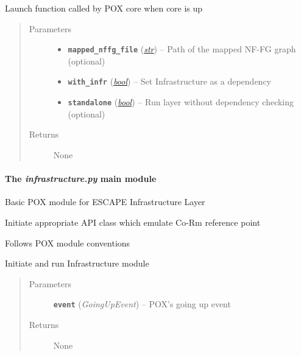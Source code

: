 \documentclass[letterpaper,10pt,english]{sphinxmanual}
\begin{document}
\begin{fulllineitems}
\label{adaptation:adaptation.launch}
Launch function called by POX core when core is up
\begin{quote}\begin{description}
\item[{Parameters}] \leavevmode\begin{itemize}
\item {} 
\textbf{\texttt{mapped\_nffg\_file}} (\href{https://docs.python.org/2.7/library/functions.html\#str}{\emph{str}}) -- Path of the mapped NF-FG graph (optional)

\item {} 
\textbf{\texttt{with\_infr}} (\href{https://docs.python.org/2.7/library/functions.html\#bool}{\emph{bool}}) -- Set Infrastructure as a dependency

\item {} 
\textbf{\texttt{standalone}} (\href{https://docs.python.org/2.7/library/functions.html\#bool}{\emph{bool}}) -- Run layer without dependency checking (optional)

\end{itemize}

\item[{Returns}] \leavevmode
None

\end{description}\end{quote}

\end{fulllineitems}



\paragraph{The \emph{infrastructure.py} main module}
\label{infrastructure:module-infrastructure}\label{infrastructure:the-infrastructure-py-main-module}\label{infrastructure::doc}
Basic POX module for ESCAPE Infrastructure Layer

Initiate appropriate API class which emulate Co-Rm reference point

Follows POX module conventions

\begin{fulllineitems}
\label{infrastructure:infrastructure._start_layer}
Initiate and run Infrastructure module
\begin{quote}\begin{description}
\item[{Parameters}] \leavevmode
\textbf{\texttt{event}} (\emph{GoingUpEvent}) -- POX's going up event

\item[{Returns}] \leavevmode
None

\end{description}\end{quote}

\end{fulllineitems}
\end{document}
